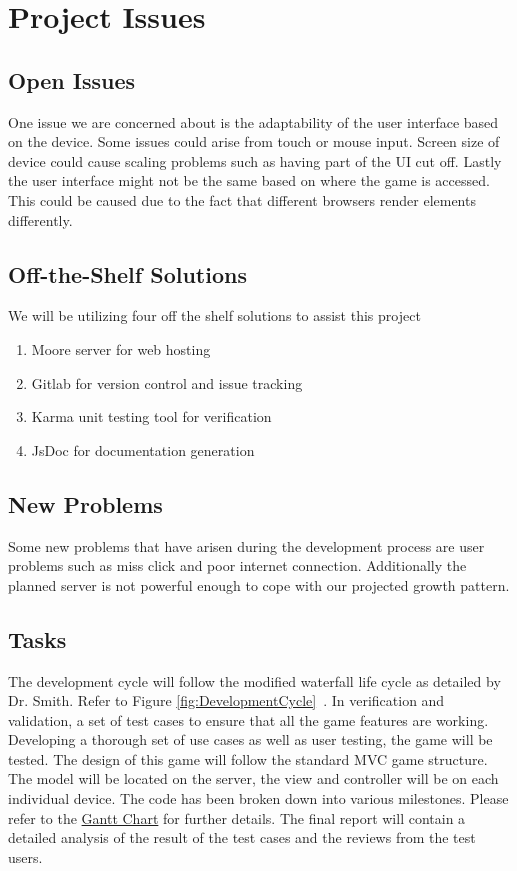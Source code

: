 \documentclass[12pt, titlepage]{article}
\begin{document}
\section{Project Issues}

\subsection{Open Issues}
One issue we are concerned about is the adaptability of the user interface based
on the device. Some issues could arise from touch or mouse
input. Screen size of device could cause scaling problems such as having
part of the UI cut off. Lastly the user interface might not be the same based on
where the game is accessed. This could be caused due to the fact that different 
browsers render elements differently.

\subsection{Off-the-Shelf Solutions}
We will be utilizing four off the shelf solutions to assist this project 

\begin{enumerate}
	\item Moore server for web hosting
  	\item Gitlab for version control and issue tracking 
	\item Karma unit testing tool for verification 
	\item JsDoc for documentation generation
\end{enumerate}

\subsection{New Problems}
Some new problems that have arisen during the development process are user
problems such as miss click and poor internet connection. Additionally the
planned server is not powerful enough to cope with our projected growth pattern.

\subsection{Tasks}
The development cycle will follow the modified waterfall life cycle as detailed
by Dr. Smith. Refer to Figure \ref{fig:DevelopmentCycle}~\citep{Slides}. In
verification and validation, a set of test cases to ensure that all the game
features are working. Developing a thorough set of use cases as well as user
testing, the game will be tested. The design of this game will follow the
standard MVC game structure. The model will be located on the server, the view
and controller will be on each individual device. The code has been broken down
into various milestones. Please refer to the
\href{run:../../ProjectSchedule/Gantt Chart.gan}{Gantt Chart} for further
details. The final report will contain a detailed analysis of the result of the
test cases and the reviews from the test users.
\end{document}
